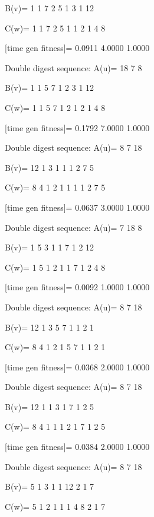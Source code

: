 B(v)=
     1     1     7     2     5     1     3     1    12

C(w)=
     1     1     7     2     5     1     1     2     1     4     8

[time gen fitness]=
    0.0911    4.0000    1.0000

Double digest sequence:
A(u)=
    18     7     8

B(v)=
     1     1     5     7     1     2     3     1    12

C(w)=
     1     1     5     7     1     2     1     2     1     4     8

[time gen fitness]=
    0.1792    7.0000    1.0000

Double digest sequence:
A(u)=
     8     7    18

B(v)=
    12     1     3     1     1     1     2     7     5

C(w)=
     8     4     1     2     1     1     1     1     2     7     5

[time gen fitness]=
    0.0637    3.0000    1.0000

Double digest sequence:
A(u)=
     7    18     8

B(v)=
     1     5     3     1     1     7     1     2    12

C(w)=
     1     5     1     2     1     1     7     1     2     4     8

[time gen fitness]=
    0.0092    1.0000    1.0000

Double digest sequence:
A(u)=
     8     7    18

B(v)=
    12     1     3     5     7     1     1     2     1

C(w)=
     8     4     1     2     1     5     7     1     1     2     1

[time gen fitness]=
    0.0368    2.0000    1.0000

Double digest sequence:
A(u)=
     8     7    18

B(v)=
    12     1     1     3     1     7     1     2     5

C(w)=
     8     4     1     1     1     2     1     7     1     2     5

[time gen fitness]=
    0.0384    2.0000    1.0000

Double digest sequence:
A(u)=
     8     7    18

B(v)=
     5     1     3     1     1    12     2     1     7

C(w)=
     5     1     2     1     1     1     4     8     2     1     7

